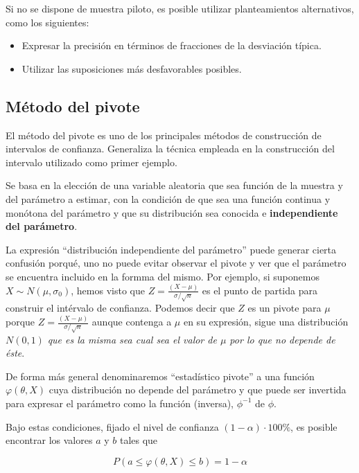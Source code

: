 \documentclass[
]{article}
\providecommand{\tightlist}{%
  \setlength{\itemsep}{0pt}\setlength{\parskip}{0pt}}
\begin{document}
Si no se dispone de muestra piloto, es posible utilizar planteamientos alternativos, como los siguientes:

\begin{itemize}
\tightlist
\item
  Expresar la precisión en términos de fracciones de la desviación típica.
\item
  Utilizar las suposiciones más desfavorables posibles.
\end{itemize}

\subsection{Método del pivote}\label{muxe9todo-del-pivote}

El método del pivote es uno de los principales métodos de construcción de intervalos de confianza. Generaliza la técnica empleada en la construcción del intervalo utilizado como primer ejemplo.

Se basa en la elección de una variable aleatoria que sea función de la muestra y del parámetro a estimar, con la condición de que sea una función continua y monótona del parámetro y que su distribución sea conocida e \textbf{independiente del parámetro}.

La expresión ``distribución independiente del parámetro'' puede generar cierta confusión porqué, uno no puede evitar observar el pivote y ver que el parámetro se encuentra incluido en la formma del mismo. Por ejemplo, si suponemos \(X\sim N(\mu, \sigma_0)\), hemos visto que \(Z=\frac{(X-\mu)}{\sigma/\sqrt{n}}\) es el punto de partida para construir el intérvalo de confianza. Podemos decir que \(Z\) es un pivote para \(\mu\) porque \(Z=\frac{(X-\mu)}{\sigma/\sqrt{n}}\) aunque contenga a \(\mu\) en su expresión, sigue una distribución \(N(0,1)\) \emph{que es la misma sea cual sea el valor de \(\mu\) por lo que no depende de éste}.

De forma más general denominaremos ``estadístico pivote'' a una función \(\varphi(\theta, X)\) cuya distribución no depende del parámetro y que puede ser invertida para expresar el parámetro como la función (inversa), \(\phi^{-1}\) de \(\phi\).

Bajo estas condiciones, fijado el nivel de confianza \((1-\alpha) \cdot 100 \%\), es posible encontrar los valores \(a\) y \(b\) tales que

\begin{equation}
P(a \leq \varphi(\theta, X) \leq b)=1-\alpha
\label{eq:pivote}
\end{equation}
\end{document}

